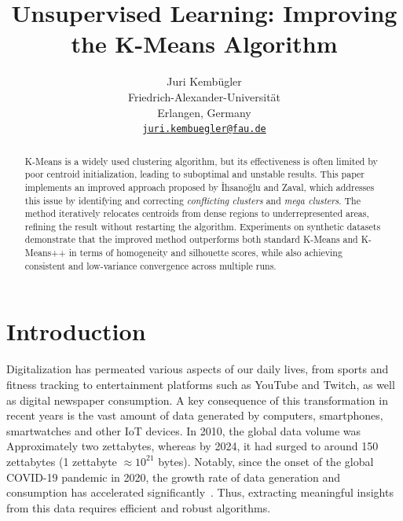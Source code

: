 \documentclass[10pt,twocolumn,letterpaper]{article}
\begin{document}
\title{Unsupervised Learning: Improving the K-Means Algorithm}

\author{Juri Kembügler\\
Friedrich-Alexander-Universität\\
Erlangen, Germany\\
{\tt\small\href{mailto:juri.kembuegler@fau.de}{juri.kembuegler@fau.de}}
}

\maketitle

\begin{abstract}
    K-Means is a widely used clustering algorithm, but its effectiveness is often
    limited by poor centroid initialization, leading to suboptimal and unstable
    results. This paper implements an improved approach proposed by İhsanoğlu and
    Zaval, which addresses this issue by identifying and correcting
    \textit{conflicting clusters} and \textit{mega clusters}. The method
    iteratively relocates centroids from dense regions to underrepresented areas,
    refining the result without restarting the algorithm. Experiments on synthetic
    datasets demonstrate that the improved method outperforms both standard K-Means
    and K-Means++ in terms of homogeneity and silhouette scores, while also
    achieving consistent and low-variance convergence across multiple runs.
\end{abstract}


\section{Introduction}\label{sec:introduction}

Digitalization has permeated various aspects of our daily lives, from sports
and fitness tracking to entertainment platforms such as YouTube and Twitch, as
well as digital newspaper consumption. A key consequence of this transformation
in recent years is the vast amount of data generated by computers, smartphones,
smartwatches and other IoT devices. In 2010, the global data volume was
Approximately two zettabytes, whereas by 2024, it had surged to around 150
zettabytes (1 zettabyte $\approx10^{21}$ bytes). Notably, since the onset of
the global COVID-19 pandemic in 2020, the growth rate of data generation and
consumption has accelerated significantly~\cite{IDC_Statista_2024}. Thus,
extracting meaningful insights from this data requires efficient and robust
algorithms.
\end{document}
